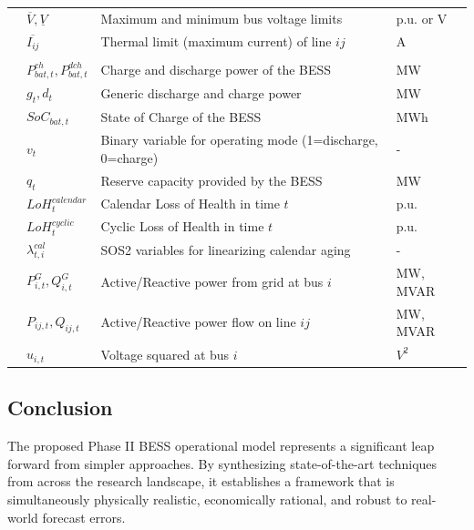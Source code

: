 \begin{longtable}{llll}
& $\overline{V}, \underline{V}$ & Maximum and minimum bus voltage limits & p.u. or V \\
& $\overline{I_{ij}}$ & Thermal limit (maximum current) of line $ij$ & A \\
\addlinespace
\multicolumn{4}{l}{\textbf{Decision Variables}} \\
& $P_{bat,t}^{ch}, P_{bat,t}^{dch}$ & Charge and discharge power of the BESS & MW \\
& $g_t, d_t$ & Generic discharge and charge power & MW \\
& $SoC_{bat,t}$ & State of Charge of the BESS & MWh \\
& $v_t$ & Binary variable for operating mode (1=discharge, 0=charge) & - \\
& $q_t$ & Reserve capacity provided by the BESS & MW \\
& $LoH_{t}^{calendar}$ & Calendar Loss of Health in time $t$ & p.u. \\
& $LoH_{t}^{cyclic}$ & Cyclic Loss of Health in time $t$ & p.u. \\
& $\lambda_{t,i}^{cal}$ & SOS2 variables for linearizing calendar aging & - \\
& $P_{i,t}^{G}, Q_{i,t}^{G}$ & Active/Reactive power from grid at bus $i$ & MW, MVAR \\
& $P_{ij,t}, Q_{ij,t}$ & Active/Reactive power flow on line $ij$ & MW, MVAR \\
& $u_{i,t}$ & Voltage squared at bus $i$ & $V^2$ \\
\end{longtable}

\subsection*{Conclusion}

The proposed Phase II BESS operational model represents a significant leap forward from simpler approaches. By synthesizing state-of-the-art techniques from across the research landscape, it establishes a framework that is simultaneously physically realistic, economically rational, and robust to real-world forecast errors.

